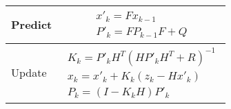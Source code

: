 \begin{center}
\begin{tabular}{ | m{5em} | m{1cm}| } 
	\hline
	Predict & \begin{align*} x'_{k} = Fx_{k-1} \\ P'_{k} = FP_{k-1}F + Q \end{align*}\\ 
	\hline
	Update & \begin{align*} K_{k} = P'_{k}H^T(HP'_{k}H^T + R)^{-1} \\ x_{k} = x'_{k} + K_k(z_k - Hx'_k) \\ P_k = (I - K_kH)P'_k \end{align*}\\ 
	\hline
\end{tabular}
\end{center}

